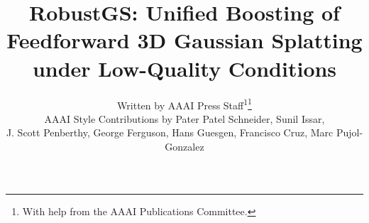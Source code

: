 \setcounter{secnumdepth}{0} %

%


\title{RobustGS: Unified Boosting of Feedforward 3D Gaussian Splatting under Low-Quality Conditions}
\author{
    Written by AAAI Press Staff\textsuperscript{\rm 1}\thanks{With help from the AAAI Publications Committee.}\\
    AAAI Style Contributions by Pater Patel Schneider,
    Sunil Issar,\\
    J. Scott Penberthy,
    George Ferguson,
    Hans Guesgen,
    Francisco Cruz\equalcontrib,
    Marc Pujol-Gonzalez\equalcontrib
}

